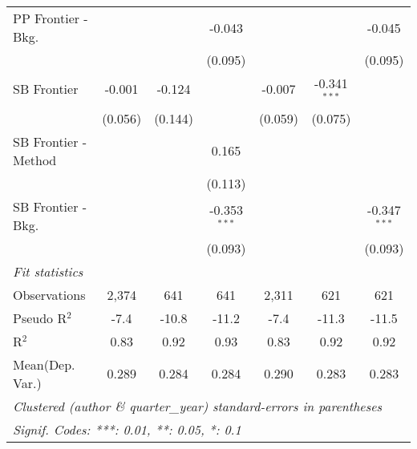 \begin{tabular}{lcccccc}
   PP Frontier - Bkg.   &              &         & -0.043         &               &                & -0.045\\   
                        &              &         & (0.095)        &               &                & (0.095)\\   
   SB Frontier          & -0.001       & -0.124  &                & -0.007        & -0.341$^{***}$ &   \\   
                        & (0.056)      & (0.144) &                & (0.059)       & (0.075)        &   \\   
   SB Frontier - Method &              &         & 0.165          &               &                &   \\   
                        &              &         & (0.113)        &               &                &   \\   
   SB Frontier - Bkg.   &              &         & -0.353$^{***}$ &               &                & -0.347$^{***}$\\   
                        &              &         & (0.093)        &               &                & (0.093)\\   
   \midrule
   \emph{Fit statistics}\\
   Observations         & 2,374        & 641     & 641            & 2,311         & 621            & 621\\  
   Pseudo R$^2$         & -7.4         & -10.8   & -11.2          & -7.4          & -11.3          & -11.5\\  
   R$^2$                & 0.83         & 0.92    & 0.93           & 0.83          & 0.92           & 0.92\\  
Mean(Dep. Var.) & 0.289 & 0.284 & 0.284 & 0.290 & 0.283 & 0.283 \\
   \midrule \midrule
   \multicolumn{7}{l}{\emph{Clustered (author \& quarter\_year) standard-errors in parentheses}}\\
   \multicolumn{7}{l}{\emph{Signif. Codes: ***: 0.01, **: 0.05, *: 0.1}}\\
\end{tabular}
\par\endgroup
